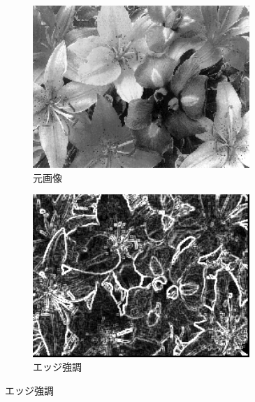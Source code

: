 \documentclass[a4paper,12pt]{jsarticle}
\begin{document}
\begin{figure}[!htbp]
\centering
\begin{subfigure}[b]{0.45\textwidth}
    \centering
    \includegraphics[width=0.9\textwidth]{./sampleimages/sample1.png}
    \caption{元画像}
\end{subfigure}
\hfill
\begin{subfigure}[b]{0.45\textwidth}
    \centering
    \includegraphics[width=0.9\textwidth]{./images/edge_enhanced_sample1_edge.png}
    \caption{エッジ強調}
\end{subfigure}


\end{figure}
\end{document}
